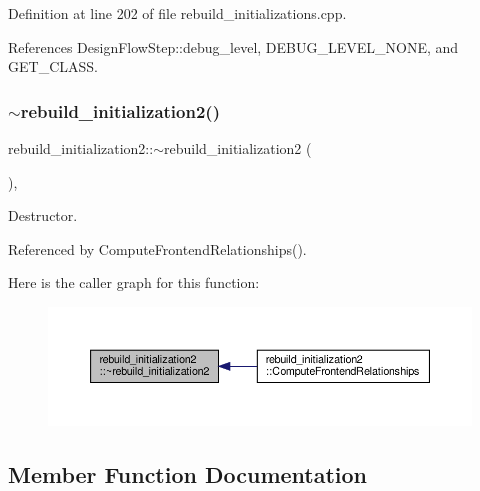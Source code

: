 Definition at line 202 of file rebuild\+\_\+initializations.\+cpp.



References Design\+Flow\+Step\+::debug\+\_\+level, D\+E\+B\+U\+G\+\_\+\+L\+E\+V\+E\+L\+\_\+\+N\+O\+NE, and G\+E\+T\+\_\+\+C\+L\+A\+SS.

\mbox{\label{classrebuild__initialization2_a33310f23ecaf85b79995c19975a21476}} 
\subsubsection{\texorpdfstring{$\sim$rebuild\+\_\+initialization2()}{~rebuild\_initialization2()}}
{\footnotesize\ttfamily rebuild\+\_\+initialization2\+::$\sim$rebuild\+\_\+initialization2 (\begin{DoxyParamCaption}{ }\end{DoxyParamCaption})\hspace{0.3cm}{\ttfamily [override]}, {\ttfamily [default]}}



Destructor. 



Referenced by Compute\+Frontend\+Relationships().

Here is the caller graph for this function\+:
\nopagebreak
\begin{figure}[H]
\begin{center}
\leavevmode
\includegraphics[width=350pt]{db/df3/classrebuild__initialization2_a33310f23ecaf85b79995c19975a21476_icgraph}
\end{center}
\end{figure}


\subsection{Member Function Documentation}
\mbox{\label{classrebuild__initialization2_a43438dd8a7fb5bca487cd7c234c6342a}} 
